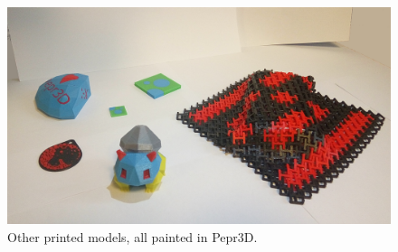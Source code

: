 \vspace{20pt}
\begin{figure}[h]
	\centering
	\centerline{\includegraphics[scale=0.25]{images/results.png}}
	\caption{Other printed models, all painted in Pepr3D.}
	\label{fig:printed2}
\end{figure}

